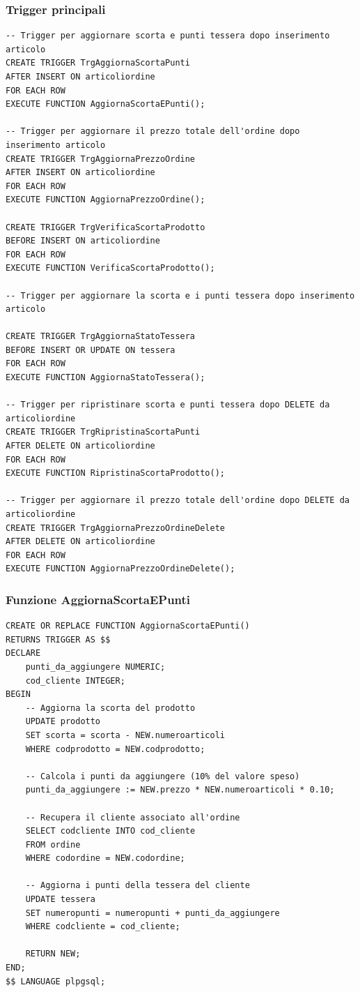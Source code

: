 \documentclass[a4paper,12pt]{article}
\begin{document}
\subsubsection*{Trigger principali}
\vspace{1.5em}
\begin{lstlisting}[style=sqlstyle]
-- Trigger per aggiornare scorta e punti tessera dopo inserimento articolo
CREATE TRIGGER TrgAggiornaScortaPunti
AFTER INSERT ON articoliordine
FOR EACH ROW
EXECUTE FUNCTION AggiornaScortaEPunti();

-- Trigger per aggiornare il prezzo totale dell'ordine dopo inserimento articolo
CREATE TRIGGER TrgAggiornaPrezzoOrdine
AFTER INSERT ON articoliordine
FOR EACH ROW
EXECUTE FUNCTION AggiornaPrezzoOrdine();

CREATE TRIGGER TrgVerificaScortaProdotto
BEFORE INSERT ON articoliordine
FOR EACH ROW
EXECUTE FUNCTION VerificaScortaProdotto();

-- Trigger per aggiornare la scorta e i punti tessera dopo inserimento articolo

CREATE TRIGGER TrgAggiornaStatoTessera
BEFORE INSERT OR UPDATE ON tessera
FOR EACH ROW
EXECUTE FUNCTION AggiornaStatoTessera();

-- Trigger per ripristinare scorta e punti tessera dopo DELETE da articoliordine
CREATE TRIGGER TrgRipristinaScortaPunti
AFTER DELETE ON articoliordine
FOR EACH ROW
EXECUTE FUNCTION RipristinaScortaProdotto();

-- Trigger per aggiornare il prezzo totale dell'ordine dopo DELETE da articoliordine
CREATE TRIGGER TrgAggiornaPrezzoOrdineDelete
AFTER DELETE ON articoliordine
FOR EACH ROW
EXECUTE FUNCTION AggiornaPrezzoOrdineDelete();
\end{lstlisting}
\vspace{1.5em}

\subsubsection*{Funzione AggiornaScortaEPunti}
\vspace{1.5em}
\begin{lstlisting}[style=sqlstyle]
CREATE OR REPLACE FUNCTION AggiornaScortaEPunti()
RETURNS TRIGGER AS $$
DECLARE
    punti_da_aggiungere NUMERIC;
    cod_cliente INTEGER;
BEGIN
    -- Aggiorna la scorta del prodotto
    UPDATE prodotto
    SET scorta = scorta - NEW.numeroarticoli
    WHERE codprodotto = NEW.codprodotto;

    -- Calcola i punti da aggiungere (10% del valore speso)
    punti_da_aggiungere := NEW.prezzo * NEW.numeroarticoli * 0.10;

    -- Recupera il cliente associato all'ordine
    SELECT codcliente INTO cod_cliente
    FROM ordine
    WHERE codordine = NEW.codordine;

    -- Aggiorna i punti della tessera del cliente
    UPDATE tessera
    SET numeropunti = numeropunti + punti_da_aggiungere
    WHERE codcliente = cod_cliente;

    RETURN NEW;
END;
$$ LANGUAGE plpgsql;
\end{lstlisting}
\vspace{1.5em}
\end{document}
